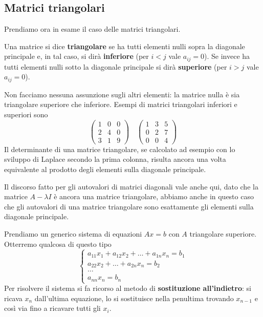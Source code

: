 \subsection{Matrici triangolari}
Prendiamo ora in esame il caso delle matrici triangolari.

\begin{definition}
	Una matrice si dice \textbf{triangolare} se ha tutti elementi nulli sopra la diagonale principale e, in
	tal caso, si dirà \textbf{inferiore} (per $i < j$ vale $a_{ij} = 0$). Se invece ha tutti elementi nulli
	sotto la diagonale principale si dirà \textbf{superiore} (per $i > j$ vale $a_{ij} = 0$).
\end{definition}

Non facciamo nessuna assunzione sugli altri elementi: la matrice nulla è sia triangolare superiore che inferiore.
Esempi di matrici triangolari inferiori e superiori sono
\[
	\begin{pmatrix}
		1 & 0 & 0 \\
		2 & 4 & 0 \\
		3 & 1 & 9
	\end{pmatrix} \quad
	\begin{pmatrix}
		1 & 3 & 5 \\
		0 & 2 & 7 \\
		0 & 0 & 4
	\end{pmatrix}
\]
Il determinante di una matrice triangolare, se calcolato ad esempio con lo sviluppo di Laplace secondo la prima
colonna, risulta ancora una volta equivalente al prodotto degli elementi sulla diagonale principale.

Il discorso fatto per gli autovalori di matrici diagonali vale anche qui, dato che la matrice $A - \lambda I$ è
ancora una matrice triangolare, abbiamo anche in questo caso che gli autovalori di una matrice triangolare sono
esattamente gli elementi sulla diagonale principale.

Prendiamo un generico sistema di equazioni $A x = b$ con $A$ triangolare superiore. Otterremo qualcosa di questo
tipo
\[
	\begin{cases}
		a_{11} x_1 + a_{12} x_2 + \dots + a_{1n} x_n = b_1 \\
		a_{22} x_2 + \dots + a_{2n} x_n = b_2              \\
		\dots                                              \\
		a_{nn} x_n = b_n
	\end{cases}
\]
Per risolvere il sistema si fa ricorso al metodo di \textbf{sostituzione all'indietro}: si ricava $x_n$
dall'ultima equazione, lo si sostituisce nella penultima trovando $x_{n-1}$ e così via fino a ricavare tutti gli
$x_i$.


